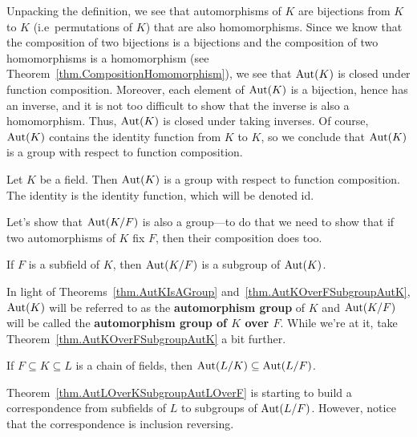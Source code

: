 Unpacking the definition, we see that automorphisms of $K$ are  bijections from $K$ to $K$ (i.e~permutations of $K$) that are also homomorphisms. Since we know that the composition of two bijections is a bijections and the composition of two homomorphisms is a homomorphism (see Theorem~\ref{thm.CompositionHomomorphism}), we see that $\operatorname{Aut}(K)$ is closed under function composition. Moreover, each element of $\operatorname{Aut}(K)$ is a bijection, hence has an inverse, and it is not too difficult to show that the inverse is also a homomorphism. Thus,  $\operatorname{Aut}(K)$ is  closed under taking inverses. Of course, $\operatorname{Aut}(K)$ contains the identity function from $K$ to $K$, so we conclude that $\operatorname{Aut}(K)$ is a group with respect to function composition.

\begin{theorem}\label{thm.AutKIsAGroup}
Let $K$ be a field. Then $\operatorname{Aut}(K)$ is a group with respect to function composition. The identity is the identity function, which will be denoted id.
\end{theorem}

Let's show that $\operatorname{Aut}(K/F)$ is also a group---to do that we  need to show that if two automorphisms of $K$ fix $F$, then their composition does too.

\begin{theorem}\label{thm.AutKOverFSubgroupAutK}
If $F$ is a subfield of $K$, then $\operatorname{Aut}(K/F)$ is a subgroup of $\operatorname{Aut}(K)$.
\end{theorem}

In light of Theorems~\ref{thm.AutKIsAGroup} and~\ref{thm.AutKOverFSubgroupAutK}, $\operatorname{Aut}(K)$ will be referred to as the \textbf{automorphism group} of $K$ and $\operatorname{Aut}(K/F)$ will be called the \textbf{automorphism group of $K$ over $F$}. While we're at it, take Theorem~\ref{thm.AutKOverFSubgroupAutK} a bit further.

\begin{theorem}\label{thm.AutLOverKSubgroupAutLOverF}
If $F\subseteq K \subseteq L$ is a chain of fields, then $\operatorname{Aut}(L/K)\subseteq \operatorname{Aut}(L/F)$.
\end{theorem}

Theorem~\ref{thm.AutLOverKSubgroupAutLOverF} is starting to build a correspondence from subfields of $L$ to subgroups of $\operatorname{Aut}(L/F)$. However, notice that the correspondence  is inclusion reversing.

\begin{center}
\end{center}

